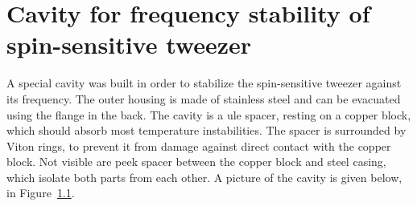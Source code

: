 \appendix
\chapter{Cavity for frequency stability of spin-sensitive tweezer}%
\label{ch:app_cavity}

A special cavity was built in order to stabilize the spin-sensitive tweezer against its frequency. The outer housing is made of stainless steel and can be evacuated using the flange in the back. The cavity is a \ac{ule} spacer, resting on a copper block, which should absorb most temperature instabilities. The spacer is surrounded by Viton rings, to prevent it from damage against direct contact with the copper block. Not visible are peek spacer between the copper block and steel casing, which isolate both parts from each other. A picture of the cavity is given below, in Figure~\ref{fig:cavity_image}.

\begin{figure}[h!]%
\label{fig:cavity_image}
\end{figure}
